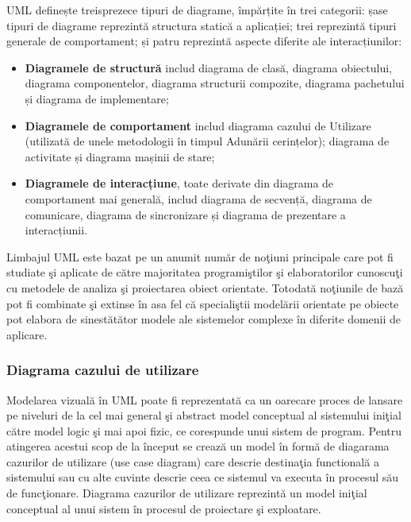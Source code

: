 UML definește treisprezece tipuri de diagrame, împărțite în trei categorii:
șase tipuri de diagrame reprezintă structura statică a aplicației; trei
reprezintă tipuri generale de comportament; și patru reprezintă aspecte
diferite ale interacțiunilor:
\begin{itemize}
\item \textbf{Diagramele de structură} includ diagrama de clasă, diagrama obiectului, diagrama componentelor, diagrama structurii compozite, diagrama pachetului și diagrama de implementare; 
\item \textbf{Diagramele de comportament} includ diagrama cazului de Utilizare (utilizată de unele metodologii în timpul Adunării cerințelor); diagrama de activitate și diagrama mașinii de stare; 
\item \textbf{Diagramele de interacțiune}, toate derivate din diagrama de comportament mai generală, includ diagrama de secvență, diagrama de comunicare, diagrama de sincronizare și diagrama de prezentare a interacțiunii.
\end{itemize}

Limbajul UML este bazat pe un anumit număr de noţiuni principale care pot fi
studiate şi aplicate de către majoritatea programiştilor şi elaboratorilor
cunoscuţi cu metodele de analiza şi proiectarea obiect orientate. Totodată
noţiunile de bază pot fi combinate şi extinse în asa fel că specialiştii
modelării orientate pe obiecte pot elabora de sinestătător modele ale
sistemelor complexe în diferite domenii de aplicare.


\vfill
\subsubsection{Diagrama cazului de utilizare}

Modelarea vizuală în UML poate fi reprezentată ca un oarecare proces de lansare
pe niveluri de la cel mai general şi abstract model conceptual al sistemului
iniţial către model logic şi mai apoi fizic, ce corespunde unui sistem de
program. Pentru atingerea acestui scop de la început se crează un model în
formă de diagarama cazurilor de utilizare (use case diagram) care descrie
destinaţia functională a sistemului sau cu alte cuvinte descrie ceea ce
sistemul va executa în procesul său de funcţionare. Diagrama cazurilor de
utilizare reprezintă un model iniţial conceptual al unui sistem în procesul de
proiectare şi exploatare.

